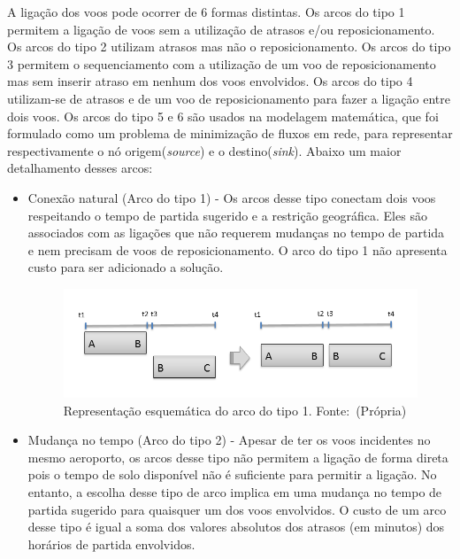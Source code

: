 A ligação dos voos pode ocorrer de 6 formas distintas. Os arcos do tipo 1
permitem a ligação de voos sem a utilização de atrasos e/ou reposicionamento.
Os arcos do tipo 2 utilizam atrasos mas não o reposicionamento. Os arcos do
tipo 3 permitem o sequenciamento com a utilização de um voo de reposicionamento
mas sem inserir atraso em nenhum dos voos envolvidos. Os arcos do tipo 4
utilizam-se de atrasos e de um voo de reposicionamento para fazer a ligação
entre dois voos. Os arcos do tipo 5 e 6 são usados na modelagem matemática, que
foi formulado como um problema de minimização de fluxos em rede, para
representar respectivamente o nó origem(\textit{source}) e o
destino(\textit{sink}). Abaixo um maior detalhamento desses arcos:
  
\begin{itemize}
\item Conexão natural (Arco do tipo 1) - Os arcos desse tipo conectam dois voos
respeitando o tempo de partida sugerido e a restrição geográfica. Eles são
associados com as ligações que não requerem mudanças no tempo de partida e nem
precisam de voos de reposicionamento. O arco do tipo 1 não apresenta custo para
ser adicionado a solução.

\begin{figure}[ht]
	\caption{Representação esquemática do arco do tipo 1. \newline \mbox{Fonte:
	(Própria)}}
	\label{fig:arc1}
	\includegraphics[scale=0.35]{./img/arc1}
	
\end{figure}

\item Mudança no tempo (Arco do tipo 2) - Apesar de ter os voos incidentes no
mesmo aeroporto, os arcos desse tipo não permitem a ligação de forma direta
pois o tempo de solo disponível não é suficiente para permitir a ligação. No
entanto, a escolha desse tipo de arco implica em uma mudança no tempo de
partida sugerido para quaisquer um dos voos envolvidos. O custo de um arco
desse tipo é igual a soma dos valores absolutos dos atrasos (em minutos) dos
horários de partida envolvidos.
      

\end{itemize}
